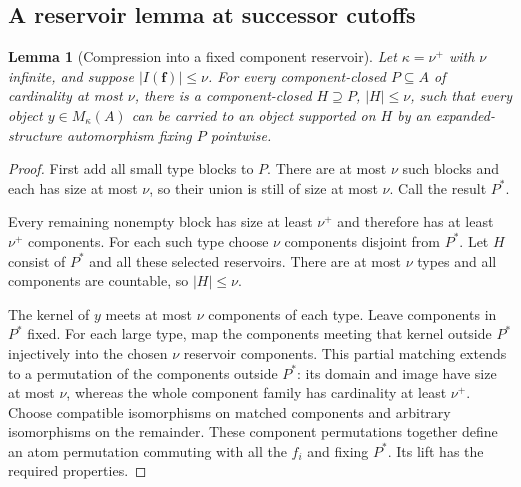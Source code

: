 \documentclass[11pt,letterpaper]{article}
\numberwithin{equation}{section}
\theoremstyle{plain}
\newtheorem{lemma}[lemma]{Lemma}
\theoremstyle{definition}
\theoremstyle{remark}
\begin{document}
\subsection{A reservoir lemma at successor cutoffs}
\begin{lemma}[Compression into a fixed component reservoir]\label{nee:lem:reservoir}
Let $\kappa=\nu^+$ with $\nu$ infinite, and suppose $|I(\boldsymbol f)|\leq\nu$. For every component-closed $P\subseteq A$ of cardinality at most $\nu$, there is a component-closed $H\supseteq P$, $|H|\leq\nu$, such that every object $y\in M_\kappa(A)$ can be carried to an object supported on $H$ by an expanded-structure automorphism fixing $P$ pointwise.
\end{lemma}
\begin{proof}
First add all small type blocks to $P$. There are at most $\nu$ such blocks and each has size at most $\nu$, so their union is still of size at most $\nu$. Call the result $P^*$.

Every remaining nonempty block has size at least $\nu^+$ and therefore has at least $\nu^+$ components. For each such type choose $\nu$ components disjoint from $P^*$. Let $H$ consist of $P^*$ and all these selected reservoirs. There are at most $\nu$ types and all components are countable, so $|H|\leq\nu$.

The kernel of $y$ meets at most $\nu$ components of each type. Leave components in $P^*$ fixed. For each large type, map the components meeting that kernel outside $P^*$ injectively into the chosen $\nu$ reservoir components. This partial matching extends to a permutation of the components outside $P^*$: its domain and image have size at most $\nu$, whereas the whole component family has cardinality at least $\nu^+$. Choose compatible isomorphisms on matched components and arbitrary isomorphisms on the remainder. These component permutations together define an atom permutation commuting with all the $f_i$ and fixing $P^*$. Its lift has the required properties.
\end{proof}
\end{document}
